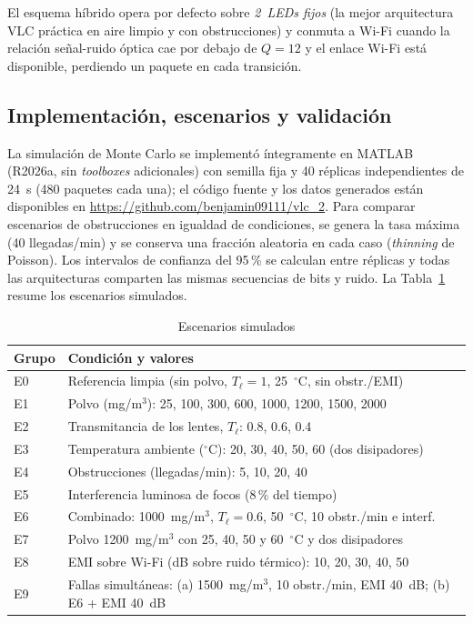 \documentclass[conference]{IEEEtran}
\begin{document}
El esquema híbrido opera por defecto sobre \emph{2~LEDs fijos} (la mejor arquitectura VLC práctica en aire limpio y con obstrucciones) y conmuta a Wi-Fi cuando la relación señal-ruido óptica cae por debajo de $Q=12$ y el enlace Wi-Fi está disponible, perdiendo un paquete en cada transición.

\subsection{Implementación, escenarios y validación}
La simulación de Monte Carlo se implementó íntegramente en MATLAB (R2026a, sin \emph{toolboxes} adicionales) con semilla fija y 40 réplicas independientes de 24~s (480 paquetes cada una); el código fuente y los datos generados están disponibles en \url{https://github.com/benjamin09111/vlc_2}. Para comparar escenarios de obstrucciones en igualdad de condiciones, se genera la tasa máxima (40 llegadas/min) y se conserva una fracción aleatoria en cada caso (\emph{thinning} de Poisson). Los intervalos de confianza del 95\,\% se calculan entre réplicas y todas las arquitecturas comparten las mismas secuencias de bits y ruido. La Tabla~\ref{tab:esc} resume los escenarios simulados.

\begin{table}[!t]
\caption{Escenarios simulados}
\label{tab:esc}
\centering
\begin{tabular}{lp{5.8cm}}
\toprule
\textbf{Grupo} & \textbf{Condición y valores}\\
\midrule
E0 & Referencia limpia (sin polvo, $T_\ell=1$, 25~$^{\circ}$C, sin obstr./EMI)\\
E1 & Polvo (mg/m$^{3}$): 25, 100, 300, 600, 1000, 1200, 1500, 2000\\
E2 & Transmitancia de los lentes, $T_\ell$: 0.8, 0.6, 0.4\\
E3 & Temperatura ambiente ($^{\circ}$C): 20, 30, 40, 50, 60 (dos disipadores)\\
E4 & Obstrucciones (llegadas/min): 5, 10, 20, 40\\
E5 & Interferencia luminosa de focos (8\,\% del tiempo)\\
E6 & Combinado: 1000~mg/m$^{3}$, $T_\ell=0.6$, 50~$^{\circ}$C, 10 obstr./min e interf.\\
E7 & Polvo 1200~mg/m$^{3}$ con 25, 40, 50 y 60~$^{\circ}$C y dos disipadores\\
E8 & EMI sobre Wi-Fi (dB sobre ruido térmico): 10, 20, 30, 40, 50\\
E9 & Fallas simultáneas: (a) 1500~mg/m$^{3}$, 10 obstr./min, EMI 40~dB; (b) E6 + EMI 40~dB\\
\bottomrule
\end{tabular}
\end{table}
\end{document}

